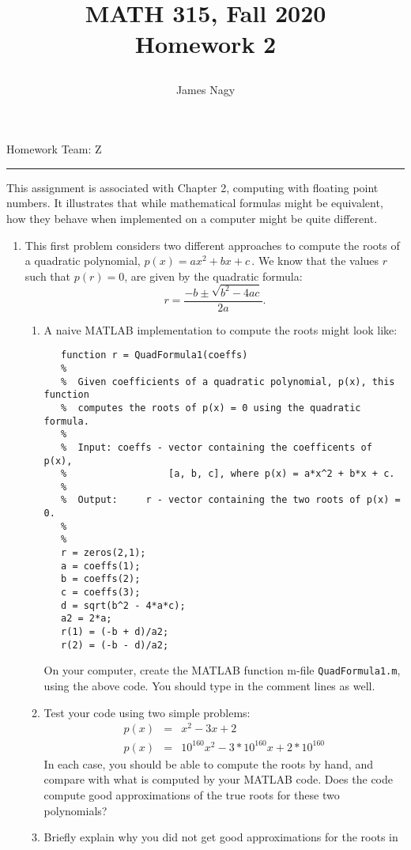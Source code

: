 \documentclass[12pt]{article}
\title{MATH 315, Fall 2020 \\[3pt]
Homework 2
\date{}}
\author{James Nagy}
\begin{document}
\maketitle

\begin{center}
Homework Team: Z \\
\rule[0pt]{12cm}{1pt}
\end{center}


This assignment is associated with Chapter 2, computing with floating point numbers. It illustrates that while mathematical formulas might be equivalent, how they behave when implemented on a computer might be quite different.  
\begin{enumerate}
\item
This first problem considers two different approaches to compute
the roots of a quadratic polynomial,
$
  p(x) = ax^2 + bx + c\,.
$
We know that the values $r$ such that $p(r) = 0$, are given by the quadratic formula:
$$
   r = \frac{-b \pm \sqrt{b^2-4ac}}{2a}.
$$
\begin{enumerate}
\item
A naive MATLAB implementation to compute the roots might look like:
\begin{verbatim}
   function r = QuadFormula1(coeffs)
   %
   %  Given coefficients of a quadratic polynomial, p(x), this function 
   %  computes the roots of p(x) = 0 using the quadratic formula.
   %
   %  Input: coeffs - vector containing the coefficents of p(x), 
   %                  [a, b, c], where p(x) = a*x^2 + b*x + c.
   %
   %  Output:     r - vector containing the two roots of p(x) = 0.
   %
   %
   r = zeros(2,1);
   a = coeffs(1);
   b = coeffs(2);
   c = coeffs(3);
   d = sqrt(b^2 - 4*a*c);
   a2 = 2*a;
   r(1) = (-b + d)/a2;
   r(2) = (-b - d)/a2;
\end{verbatim}
On your computer, create the MATLAB function m-file {\tt QuadFormula1.m}, using
the above code.  You should type in the comment lines
as well.
\item
Test your code using two simple problems:
\begin{eqnarray*}
  p(x) & = & x^2 - 3x + 2 \\
  p(x) & = & 10^{160}x^2 - 3*10^{160}x + 2*10^{160}
\end{eqnarray*}
In each case, you should be able to compute the roots by hand, and compare with what is computed by your MATLAB code. Does the code compute good approximations of the true roots for these two polynomials?
\item
Briefly explain why you did not get good approximations for the roots in

\end{enumerate}
\end{enumerate}
\end{document}
